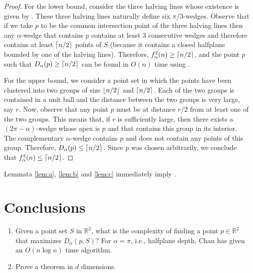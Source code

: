 \documentclass[lotsofwhite]{patmorin}
\begin{document}
\begin{proof}
For the lower bound, consider the three halving lines whose existence
is given by .  These three halving lines
naturally define six $\pi/3$-wedges.  Observe that if we take $p$ to
be the common intersection point of the three halving lines then any
$\alpha$-wedge that contains $p$ contains at least 3 consecutive
wedges and therefore contains at least $\left\lceil n/2 \right\rceil$ points of $S$
(because it contains a closed halfplane bounded by one of the
halving lines).  Therefore, $f^2_\alpha(n)\ge \left\lceil n/2 \right\rceil$, and the
point $p$ such that $D_\alpha(p)\ge \left\lceil n/2 \right\rceil$ can be found in $O(n)$
time using .

 
For the upper bound, we consider a point set in which the points have
been clustered into two groups of size $\left\lfloor n/2 \right\rfloor$ and $\left\lceil n/2 \right\rceil$.
Each of the two groups is contained in a unit ball and the distance
between the two groups is very large, say $r$.  Now, observe that
any point $p$ must be at distance $r/2$ from at least one of the
two groups.  This means that, if $r$ is sufficiently large, then
there exists a $(2\pi-\alpha)$-wedge whose apex is $p$ and that
contains this group in its interior.  The complementary $\alpha$-wedge
contains $p$ and does not contain any points of this group.
Therefore, $D_\alpha(p)\le \left\lceil n/2 \right\rceil$.  Since $p$ was chosen
arbitrarily, we conclude that $f^2_\alpha(n)\le \left\lceil n/2 \right\rceil$.
\end{proof}

Lemmata \ref{lem:a}, \ref{lem:b} and \ref{lem:c} immediately imply
.

\section{Conclusions}

\begin{enumerate}
\item Given a point set $S$ in $\mathbb{R}^2$, what is the complexity
of finding a point $p\in\mathbb{R}^2$ that maximizes $D_\alpha(p,S)$?
For $\alpha=\pi$, i.e., halfplane depth, Chan has given an $O(n\log
n)$ time algorithm.

\item Prove a theorem in $d$ dimensions.

\end{enumerate}





\end{document}
